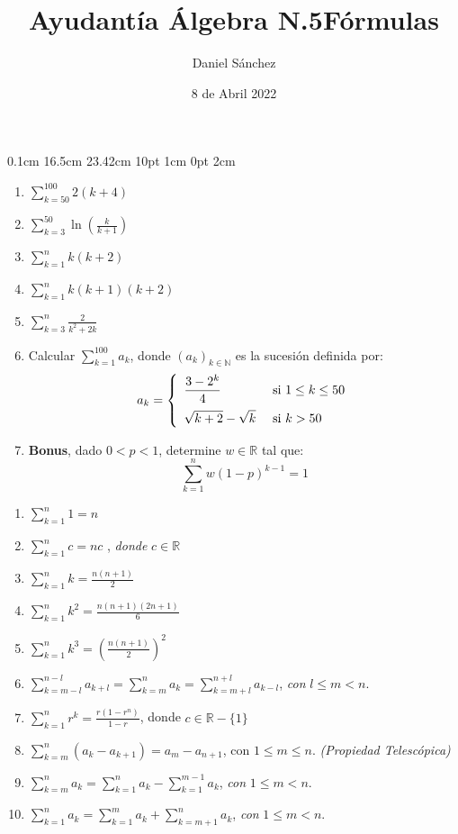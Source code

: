 \documentclass[12pt]{article}
\newcommand{\D}{\displaystyle}
\begin{document}
\setmargins{2.5cm}
{0.1cm}
{16.5cm}
{23.42cm}
{10pt}
{1cm}
{0pt}
{2cm}

\title{Ayudant\'ia \'Algebra N.5}
\date{8 de Abril 2022}
\author{Daniel S\'anchez}
\maketitle

\begin{enumerate}
      \item $\D \sum_{k = 50}^{100} 2(k+4)$
      \item $\D \sum_{k = 3}^{50} \ln \left(\frac{k}{k+1}\right)$
      \item $\D \sum_{k = 1}^{n} k(k+2)$
      \item $\D \sum_{k = 1}^{n} k(k+1)(k+2)$
      \item $\D \sum_{k = 3}^{n} \frac{2}{k^2+2k}$
      \item Calcular $\D \sum_{k=1}^{100} a_k$, donde $(a_k)_{k \in \mathbb{N}}$ es la sucesi\'on definida por:
            $$a_k=\left\{
                  \begin{array}{ll}
                        \D \frac{3-2^k}{4}     & \mbox{ si } 1 \leq k \leq 50 \\[3\jot]
                        \D \sqrt{k+2}-\sqrt{k} & \mbox{ si } k > 50
                  \end{array}
                  \right.$$
      \item \textbf{Bonus}, dado $0 < p < 1$, determine $w \in \mathbb{R}$ tal que:
            $$\D \sum_{k = 1}^{n} w(1-p)^{k-1} = 1$$
\end{enumerate}


\pagebreak
\title{\LARGE{\textbf{F\'ormulas}}}
\maketitle
\begin{enumerate}
      \item $\D \sum_{k = 1}^{n} 1 = n $
      \item $\D \sum_{k = 1}^{n} c = nc $ , \textit{donde} $c \in \mathbb{R}$
      \item $\D \sum_{k = 1}^{n} k = \frac{n(n+1)}{2} $
      \item $\D \sum_{k = 1}^{n} k^2 = \frac{n(n+1)(2n+1)}{6} $
      \item $\D \sum_{k = 1}^{n} k^3 = {\left(\frac{n(n+1)}{2}\right)}^2 $
      \item $\D \sum_{k = m-l}^{n-l} a_{k+l} = \sum_{k = m}^{n} a_k = \sum_{k = m+l}^{n+l} a_{k-l}$, \textit{con} $l \leq m < n$.
      \item $\D \sum_{k = 1}^{n} r^k = \frac{r(1-r^n)}{1-r} $, donde $c \in \mathbb{R}-\{1\}$
      \item $\D \sum_{k = m}^{n} (a_k-a_{k+1}) = a_m-a_{n+1}$, con $1\leq m \leq n$. \textit{(Propiedad Telesc\'opica)}
      \item $\D \sum_{k = m}^{n} a_k = \sum_{k = 1}^{n} a_k - \sum_{k = 1}^{m-1} a_k $, \textit{con} $1 \leq m < n$.
      \item $\D \sum_{k = 1}^{n} a_k = \sum_{k = 1}^{m} a_k + \sum_{k = m+1}^{n} a_k $, \textit{con} $1 \leq m < n$.
\end{enumerate}
\end{document}
